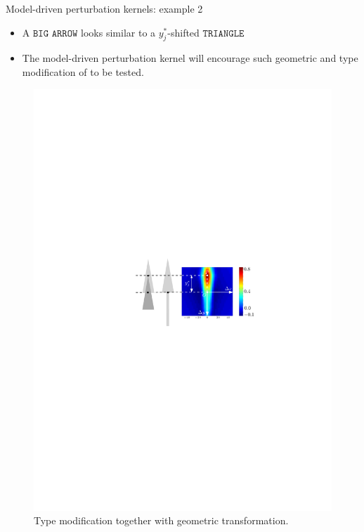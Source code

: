\documentclass{beamer}
\begin{document}
\begin{frame}{Model-driven perturbation kernels: example 2}
\begin{itemize}
\item A $\texttt{BIG ARROW}$  looks similar to a $y_j^*$-shifted $\texttt{TRIANGLE}$ 
 \item The model-driven perturbation kernel will encourage such geometric and type modification of to be tested.
\end{itemize}

\begin{figure}
\centering
\includegraphics[width = 0.9\linewidth]{correlation_f_t}
\caption{Type modification together with geometric transformation.}
\end{figure}
\end{frame}
\end{document}

